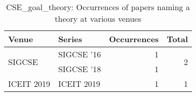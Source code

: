 \begin{table*}[t]
\begin{tabular}{llrr}
Venue & Series & Occurrences & Total\\\hline
\multirow{2}{*}{SIGCSE } & SIGCSE '16 & 1 & \multirow{2}{*}{2}\\
& SIGCSE '18 & 1 &\\
\multirow{1}{*}{ICEIT 2019} & ICEIT 2019 & 1 & \multirow{1}{*}{1}\\
\end{tabular}
\caption{CSE\_goal\_theory: Occurrences of papers naming a theory at various venues}
\end{table*}